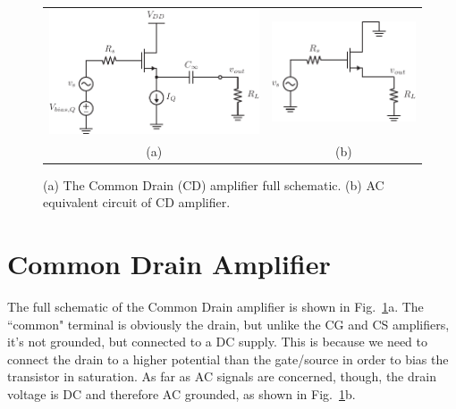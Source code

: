 \begin{figure}[tb]
\begin{center}
\begin{tabular}{cc}
\includegraphics[scale=.9]{cd_amp_dc} &
\includegraphics[scale=.9]{cd_amp_ac} \\
(a) & (b) \\
\end{tabular}
\end{center}
\caption{(a) The Common Drain (CD) amplifier full schematic.  (b) AC equivalent circuit of CD amplifier.}
\label{fig:cd_amp_dc_ac}
\end{figure}
\section{Common Drain Amplifier}
The full schematic of the Common Drain amplifier is shown in Fig.~\ref{fig:cd_amp_dc_ac}a.  The ``common" terminal is obviously the drain, but unlike the CG and CS amplifiers, it's not grounded, but connected to a DC supply.  This is because we need to connect the drain to a higher potential than the gate/source in order to bias the transistor in saturation.  As far as AC signals are concerned, though, the drain voltage is DC and therefore AC grounded, as shown in Fig.~\ref{fig:cd_amp_dc_ac}b.
